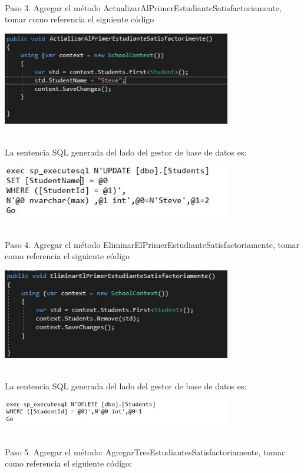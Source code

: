 \textbf{}\\
Paso 3. Agregar el método ActualizarAlPrimerEstudianteSatisfactoriamente, tomar como referencia el siguiente código
\begin{center}
	\includegraphics[width=10cm]{./Imagenes/Captura13} 
	\end{center}
\textbf{}\\
La sentencia SQL generada del lado del gestor de base de datos es:

\begin{center}
	\includegraphics[width=10cm]{./Imagenes/U1-6} 
	\end{center}
\textbf{}\\
Paso 4. Agregar el método EliminarElPrimerEstudianteSatisfactoriamente, tomar como referencia el siguiente
código

\begin{center}
	\includegraphics[width=10cm]{./Imagenes/Captura10} 
	\end{center}

\textbf{}\\
La sentencia SQL generada del lado del gestor de base de datos es:
\begin{center}
	\includegraphics[width=10cm]{./Imagenes/U2-2} 
	\end{center}
\textbf{}\\
Paso 5. Agregar el método: AgregarTresEstudiantesSatisfactoriamente, tomar como referencia el siguiente código:

